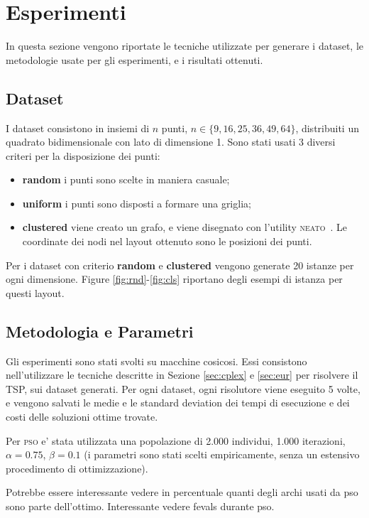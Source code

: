 \documentclass[
12pt, %
a4paper, %
oneside, %
headinclude,footinclude, %
BCOR5mm, %
]{scrartcl}
\begin{document}
\section{Esperimenti}\label{sec:exp}
In questa sezione vengono riportate le tecniche utilizzate per generare i dataset, le metodologie usate per gli esperimenti, e i risultati ottenuti.

\subsection{Dataset}
I dataset consistono in insiemi di $n$ punti, $n \in \{9, 16, 25, 36, 49, 64\}$, distribuiti un quadrato bidimensionale con lato di dimensione 1. Sono stati usati 3 diversi criteri per la disposizione dei punti:
\begin{itemize}
	\item \textbf{random} i punti sono scelte in maniera casuale;
	\item \textbf{uniform} i punti sono disposti a formare una griglia;
	\item \textbf{clustered} viene creato un grafo, e viene disegnato con l'utility \textsc{neato}~\cite{north2004drawing}. Le coordinate dei nodi nel layout ottenuto sono le posizioni dei punti.
\end{itemize}
Per i dataset con criterio \textbf{random} e \textbf{clustered} vengono generate 20 istanze per ogni dimensione. Figure \ref{fig:rnd}-\ref{fig:cls} riportano degli esempi di istanza per questi layout. 

\subsection{Metodologia e Parametri}

Gli esperimenti sono stati svolti su macchine cosicosi. Essi consistono nell'utilizzare le tecniche descritte in Sezione \ref{sec:cplex} e \ref{sec:eur} per risolvere il TSP, sui dataset generati. Per ogni dataset, ogni risolutore viene eseguito 5 volte, e vengono salvati le medie e le standard deviation dei tempi di esecuzione e dei costi delle soluzioni ottime trovate. 

Per \textsc{pso} e' stata utilizzata una popolazione di 2.000 individui, 1.000 iterazioni, $\alpha = 0.75$, $\beta=0.1$ (i parametri sono stati scelti empiricamente, senza un estensivo procedimento di ottimizzazione).

Potrebbe essere interessante vedere in percentuale quanti degli archi usati da pso sono parte dell'ottimo. Interessante vedere fevals durante pso.
\end{document}
